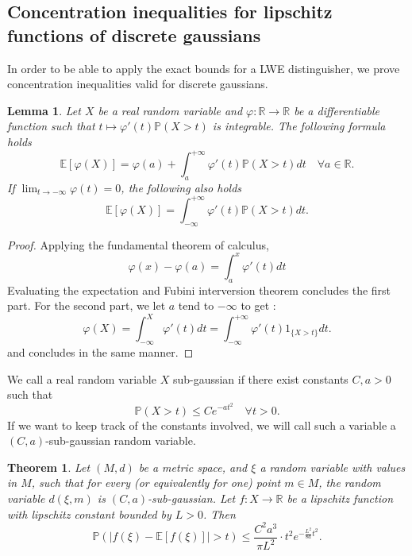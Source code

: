 \documentclass{article}
\newtheorem{theorem}{Theorem}
\newtheorem{lemma}{Lemma}
\begin{document}
\subsection{Concentration inequalities for lipschitz functions of discrete gaussians}
In order to be able to apply the exact bounds for a LWE distinguisher, we prove concentration inequalities valid for discrete gaussians. 

\begin{lemma}
Let $X$ be a real random variable and $\varphi : \mathbb R \rightarrow \mathbb R$ be a differentiable function such that $t\mapsto \varphi'(t)\mathbb P(X>t)$ is integrable. The following formula holds
$$\mathbb E [\varphi(X)] = \varphi(a) + \int_{a}^{+\infty} \varphi'(t)\mathbb P(X > t) dt \quad \forall a \in \mathbb R.$$
If $\lim_{t\rightarrow -\infty}\varphi(t) =0$, the following also holds
$$\mathbb E [\varphi(X)] = \int_{-\infty}^{+\infty} \varphi'(t)\mathbb P(X > t) dt.$$
\end{lemma}

\begin{proof}
Applying the fundamental theorem of calculus,
$$\varphi(x)-\varphi(a) = \int_a^x\varphi'(t)dt$$
Evaluating the expectation and Fubini interversion theorem concludes the first part.
For the second part, we let $a$ tend to $-\infty$ to get :
$$\varphi(X) = \int_{-\infty}^X\varphi'(t)dt = \int_{-\infty}^{+\infty} \varphi'(t) 1_{\{X > t\}} dt.$$
and concludes in the same manner.
\end{proof}

We call a real random variable $X$ sub-gaussian if there exist constants $C , a>0$ such that 
$$\mathbb P( X > t ) \leq Ce^{-at^2} \quad \forall t >0.$$ 
If we want to keep track of the constants involved, we will call such a variable a $(C,a)$-sub-gaussian random variable.

\begin{theorem}
Let $(M,d)$ be a metric space, and $\xi$ a random variable with values in $M$, such that for every (or equivalently for one) point $m\in M$, the random variable $d(\xi, m)$ is $(C,a)$-sub-gaussian. Let $f : X\rightarrow \mathbb R$ be a lipschitz function with lipschitz constant bounded by $L>0$. Then  
$$\mathbb P(|f(\xi)  - \mathbb E[f(\xi)]| > t) \leq   \frac{C^2a^3}{\pi L^2} \cdot t^2 e^{-\frac{ L^2}{8a}t^2} .$$
\end{theorem}
\end{document}
